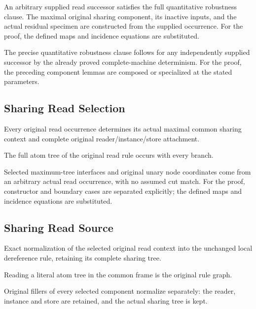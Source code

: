 An arbitrary supplied read successor satisfies the full quantitative robustness clause. The maximal original sharing component, its inactive inputs, and the actual residual specimen are constructed from the supplied occurrence.
For the proof, the defined maps and incidence equations are substituted.
\par{}

The precise quantitative robustness clause follows for any independently supplied successor by the already proved complete-machine determinism.
For the proof, the preceding component lemmas are composed or specialized at the stated parameters.
\par{}

\subsection{Sharing Read Selection}
Every original read occurrence determines its actual maximal common sharing context and complete original reader/instance/store attachment.

The full atom tree of the original read rule occurs with every branch.
\par{}

Selected maximum-tree interfaces and original unary node coordinates come from an arbitrary actual read occurrence, with no assumed cut match.
For the proof, constructor and boundary cases are separated explicitly; the defined maps and incidence equations are substituted.
\par{}

\subsection{Sharing Read Source}
Exact normalization of the selected original read context into the unchanged local dereference rule, retaining its complete sharing tree.

Reading a literal atom tree in the common frame is the original rule graph.
\par{}

Original fillers of every selected component normalize separately: the reader, instance and store are retained, and the actual sharing tree is kept.
\par{}

